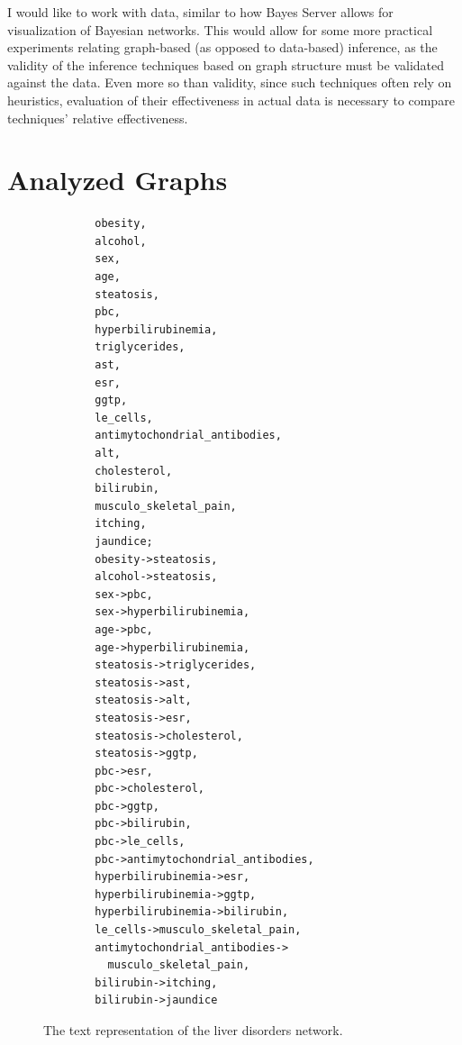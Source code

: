 \documentclass{article}
\begin{document}
	I would like to work with data, similar to how Bayes Server\cite{bayesServer} allows for visualization of Bayesian networks.
	This would allow for some more practical experiments relating graph-based (as opposed to data-based) inference, as the validity of the inference techniques based on graph structure must be validated against the data.
	Even more so than validity, since such techniques often rely on heuristics, evaluation of their effectiveness in actual data is necessary to compare techniques' relative effectiveness.
	
	
	
	
	
	\appendix
	
	\section{Analyzed Graphs}
	\label{analyzedgraphs}
	\begin{figure}
	\begin{verbatim}
		obesity,
		alcohol,
		sex,
		age,
		steatosis,
		pbc,
		hyperbilirubinemia,
		triglycerides,
		ast,
		esr,
		ggtp,
		le_cells,
		antimytochondrial_antibodies,
		alt,
		cholesterol,
		bilirubin,
		musculo_skeletal_pain,
		itching,
		jaundice;
		obesity->steatosis,
		alcohol->steatosis,
		sex->pbc,
		sex->hyperbilirubinemia,
		age->pbc,
		age->hyperbilirubinemia,
		steatosis->triglycerides,
		steatosis->ast,
		steatosis->alt,
		steatosis->esr,
		steatosis->cholesterol,
		steatosis->ggtp,
		pbc->esr,
		pbc->cholesterol,
		pbc->ggtp,
		pbc->bilirubin,
		pbc->le_cells,
		pbc->antimytochondrial_antibodies,
		hyperbilirubinemia->esr,
		hyperbilirubinemia->ggtp,
		hyperbilirubinemia->bilirubin,
		le_cells->musculo_skeletal_pain,
		antimytochondrial_antibodies->
		  musculo_skeletal_pain,
		bilirubin->itching,
		bilirubin->jaundice
	\end{verbatim}
	\caption{The text representation of the liver disorders network.}
	\end{figure}
\end{document}
